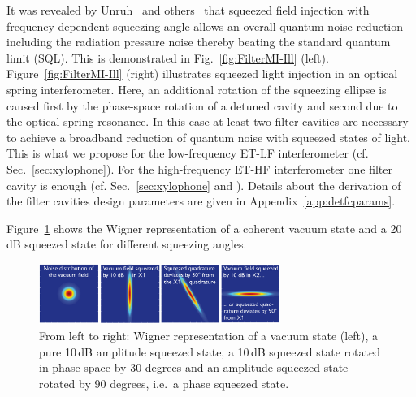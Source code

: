 It was revealed by Unruh~\cite{Unruh1982} and others~\cite{Yuen1983, Pace1993} that squeezed field injection with frequency dependent squeezing angle allows an overall quantum noise reduction including the radiation pressure noise thereby beating the standard quantum limit (SQL). This is demonstrated in Fig.~\ref{fig:FilterMI-Ill} (left).
Figure~\ref{fig:FilterMI-Ill} (right) illustrates squeezed light injection in an optical spring interferometer. Here, an additional rotation of the squeezing ellipse is caused first by the phase-space rotation of a detuned cavity and second due to the optical spring resonance. In this case at least two filter cavities are necessary to achieve a broadband reduction of quantum noise with squeezed states of light. This is what we propose for the low-frequency ET-LF interferometer (cf. Sec.~\ref{sec:xylophone}). For the high-frequency ET-HF interferometer one filter cavity is enough (cf. Sec.~\ref{sec:xylophone} and \cite{Hild2010b}). Details about the derivation of the filter cavities design parameters are given in Appendix~\ref{app:detfcparams}.

Figure~\ref{fig:WigIll} shows the Wigner representation of a coherent vacuum state and a 20\,dB squeezed state for different squeezing angles.
\begin{figure}[H]
\centering
\includegraphics[width=0.7\textwidth]{Sec_Optics/WigSqzIll.pdf}%
\caption[Wigner representation of squeezed states ]{From left to right: Wigner representation of a vacuum state (left), a pure 10\,dB amplitude squeezed state, a 10\,dB squeezed state rotated in phase-space by 30 degrees and an amplitude squeezed state rotated by 90 degrees, i.e.\ a phase squeezed state.}
\label{fig:WigIll}
\end{figure}

\FloatBarrier
